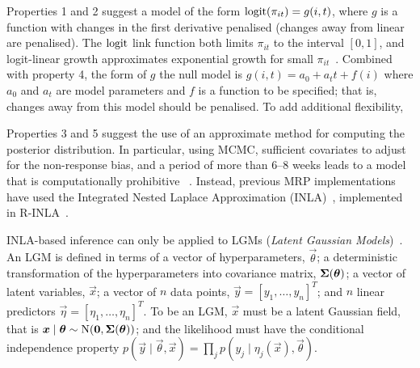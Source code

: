 \documentclass[thesis.tex]{subfiles}
\begin{document}
Properties 1 and 2 suggest a model of the form $\operatorname{logit}(\pi_{it}) = g(i, t)$, where $g$ is a function with changes in the first derivative penalised (\ie changes away from linear are penalised).
The $\operatorname{logit}$ link function both limits $\pi_{it}$ to the interval $[0, 1]$, and logit-linear growth approximates exponential growth for small $\pi_{it}$~\autocite{ealesAppropriately}.
Combined with property 4, the form of $g$ the null model is $g(i, t) = a_0 + a_t t + f(i)$ where $a_0$ and $a_t$ are model parameters and $f$ is a function to be specified; that is, changes away from this model should be penalised.
To add additional flexibility, 



Properties 3 and 5 suggest the use of an approximate method for computing the posterior distribution.
In particular, using MCMC, sufficient covariates to adjust for the non-response bias, and a period of more than 6--8 weeks leads to a model that is computationally prohibitive ~.
Instead, previous MRP implementations have used the Integrated Nested Laplace Approximation (INLA)~\autocite{rueINLA}, implemented in R-INLA~\autocite{RINLA}.

INLA-based inference can only be applied to LGMs (\emph{Latent Gaussian Models})~\autocite{rueINLAseminar,rueINLA,martinoINLAtutorial}.
An LGM is defined in terms of a vector of hyperparameters, $\vec{\theta}$; a deterministic transformation of the hyperparameters into covariance matrix, $\bm{\Sigma}(\bm{\theta})$; a vector of latent variables, $\vec{x}$; a vector of $n$ data points, $\vec{y} = [y_1, \dots, y_n]^T$; and $n$ linear predictors $\vec{\eta} = [\eta_1, \dots, \eta_n]^T$.
To be an LGM, $\vec{x}$ must be a latent Gaussian field, that is $\bm{x} \mid \bm{\theta} \sim \operatorname{N}(\bm{0}, \bm{\Sigma}(\bm{\theta}))$; and the likelihood must have the conditional independence property $p(\vec{y} \mid \vec{\theta}, \vec{x}) = \prod_j p(y_j \mid \eta_j(\vec{x}), \vec{\theta})$.
\end{document}
